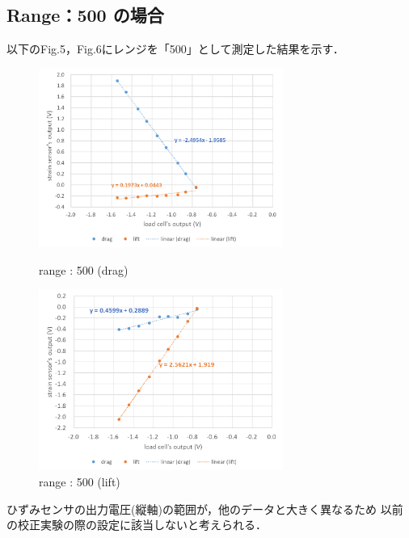 \documentclass[twocolumn,a4j]{jsarticle}
\begin{document}
\subsection{Range：500 の場合}
以下のFig.5，Fig.6にレンジを「500」として測定した結果を示す．
\begin{figure}[htbp]
    \footnotesize
    \begin{center}
        \includegraphics[width=80mm]{../images/500_drag.png}
        \caption{range : 500 (drag)}
        \includegraphics[width=80mm]{../images/500_lift.png}
        \caption{range : 500 (lift)}
    \end{center}
\end{figure}\par
ひずみセンサの出力電圧(縦軸)の範囲が，他のデータと大きく異なるため
以前の校正実験の際の設定に該当しないと考えられる．
\newpage
\end{document}
